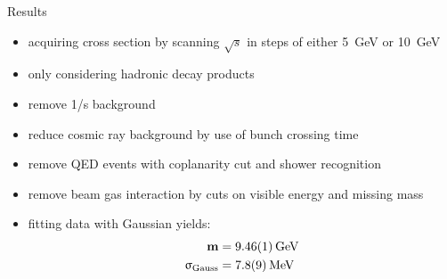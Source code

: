 \begin{frame}{Results}
	
	\begin{minipage}[c][.4\textheight]{0.65\textwidth}
		\begin{itemize}\itemfill
			\item acquiring cross section by scanning $\sqrt{s}$ in steps of either \SI{5}{\giga\electronvolt} or \SI{10}{\giga\electronvolt}
			\item only considering hadronic decay products
			\item remove 1/s background
			\item reduce cosmic ray background by use of bunch crossing time
		\end{itemize}
	\end{minipage}
	\begin{minipage}{.31\textwidth}
	\end{minipage}
	
	\begin{itemize}\itemfill
		\item remove QED events with coplanarity cut and shower recognition
		\item remove beam gas interaction by cuts on visible energy and missing mass
		\item fitting data with Gaussian yields:
		{\begin{align*}
			\z{\textbf{m}} &= \textbf{\SI{9.46\pm.01}{\giga\electronvolt}}\\
			\mathbf{\upsigma_{\z{Gauss}}} &= \textbf{\SI{7.8\pm.9}{\mega\electronvolt}}
		\end{align*}}
	\end{itemize}\vspace*{-20pt}

	
\end{frame}
